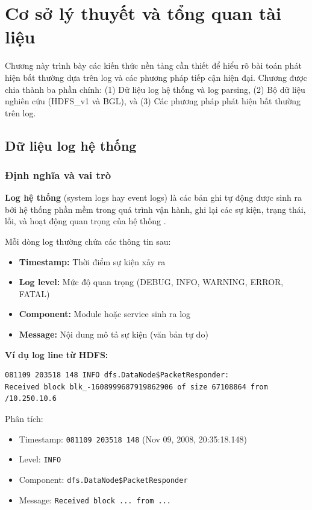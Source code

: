 
\chapter{Cơ sở lý thuyết và tổng quan tài liệu}
\label{chap:background}

Chương này trình bày các kiến thức nền tảng cần thiết để hiểu rõ bài toán phát hiện bất thường dựa trên log và các phương pháp tiếp cận hiện đại. Chương được chia thành ba phần chính: (1) Dữ liệu log hệ thống và log parsing, (2) Bộ dữ liệu nghiên cứu (HDFS\_v1 và BGL), và (3) Các phương pháp phát hiện bất thường trên log.

\section{Dữ liệu log hệ thống}
\label{sec:system-logs}

\subsection{Định nghĩa và vai trò}

\textbf{Log hệ thống} (system logs hay event logs) là các bản ghi tự động được sinh ra bởi hệ thống phần mềm trong quá trình vận hành, ghi lại các sự kiện, trạng thái, lỗi, và hoạt động quan trọng của hệ thống \cite{he2021loghub2}. 

Mỗi dòng log thường chứa các thông tin sau:

\begin{itemize}
    \item \textbf{Timestamp:} Thời điểm sự kiện xảy ra
    \item \textbf{Log level:} Mức độ quan trọng (DEBUG, INFO, WARNING, ERROR, FATAL)
    \item \textbf{Component:} Module hoặc service sinh ra log
    \item \textbf{Message:} Nội dung mô tả sự kiện (văn bản tự do)
\end{itemize}

\textbf{Ví dụ log line từ HDFS:}

\begin{verbatim}
081109 203518 148 INFO dfs.DataNode$PacketResponder: 
Received block blk_-1608999687919862906 of size 67108864 from /10.250.10.6
\end{verbatim}

Phân tích:
\begin{itemize}
    \item Timestamp: \texttt{081109 203518 148} (Nov 09, 2008, 20:35:18.148)
    \item Level: \texttt{INFO}
    \item Component: \texttt{dfs.DataNode\$PacketResponder}
    \item Message: \texttt{Received block ... from ...}
\end{itemize}

